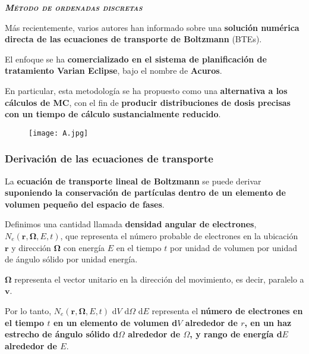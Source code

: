 \documentclass[aspectratio=169,xcolor=dvipsnames,t]{beamer}
\begin{document}


\begin{frame}[standout]
    \centering\LARGE
    \textbf{\itshape\scshape Método de ordenadas discretas}
\end{frame}

\begin{frame}

    Más recientemente, varios autores han informado sobre una \textbf{solución numérica directa de las ecuaciones de transporte de Boltzmann} (BTEs).

    El enfoque se ha \textbf{comercializado en el sistema de planificación de tratamiento Varian Eclipse}, bajo el nombre de \textbf{Acuros}. 
    
    En particular, esta metodología se ha propuesto como una \textbf{alternativa a los cálculos de MC}, con el fin de \textbf{producir distribuciones de dosis precisas con un tiempo de cálculo sustancialmente reducido}.

    \vspace{-0.05cm}

    \begin{figure}
        \centering
        \texttt{[image: A.jpg]}
    \end{figure}

\end{frame}

\begin{frame}

    \frametitle{Derivación de las ecuaciones de transporte}

    La \textbf{ecuación de transporte lineal de Boltzmann} se puede derivar \textbf{suponiendo la conservación de partículas dentro de un elemento de volumen pequeño del espacio de fases}.

    Definimos una cantidad llamada \textbf{densidad angular de electrones}, $N_e(\mathbf{r},\bm{\Omega},E,t)$, que representa el número probable de electrones en la ubicación $\mathbf{r}$ y dirección $\bm{\Omega}$ con energía $E$ en el tiempo $t$ por unidad de volumen por unidad de ángulo sólido por unidad energía. 
    
    $\bm{\Omega}$ representa el vector unitario en la dirección del movimiento, es decir, paralelo a $\mathbf{v}$.

    Por lo tanto, $N_e(\mathbf{r},\bm{\Omega},E,t)$ d$V$ d$\Omega$ d$E$  representa el \textbf{número de electrones en el tiempo $t$ en un elemento de volumen d$V$ alrededor de $r$, en un haz estrecho de ángulo sólido d$\Omega$ alrededor de $\Omega$, y rango de energía d$E$ alrededor de $E$}.

\end{frame}
\end{document}
